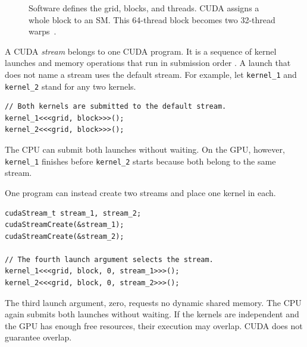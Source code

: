 \documentclass[11pt]{article}
\numberwithin{equation}{section}
\numberwithin{figure}{section}
\numberwithin{table}{section}
\newcommand{\code}[1]{\texttt{#1}}
\begin{document}
\begin{figure}[htbp]
  \caption{Software defines the grid, blocks, and threads.  CUDA assigns a whole
  block to an SM.  This 64-thread block becomes two 32-thread
  warps~\cite{gupta2020model,cuda-programming-guide}.}
  \label{fig:cuda-programming-model}
\end{figure}

\FloatBarrier

A CUDA \emph{stream} belongs to one CUDA program.  It is a sequence of kernel
launches and memory operations that run in submission order
\cite{cuda-programming-guide}.  A launch that does not name a stream uses the
default stream.  For example, let \code{kernel\_1} and \code{kernel\_2} stand for
any two kernels.

\begin{lstlisting}[language=CUDA,numbers=none]
// Both kernels are submitted to the default stream.
kernel_1<<<grid, block>>>();
kernel_2<<<grid, block>>>();
\end{lstlisting}

The CPU can submit both launches without waiting.  On the GPU, however,
\code{kernel\_1} finishes before \code{kernel\_2} starts because both belong to the
same stream.

One program can instead create two streams and place one kernel in each.

\begin{lstlisting}[language=CUDA,numbers=none]
cudaStream_t stream_1, stream_2;
cudaStreamCreate(&stream_1);
cudaStreamCreate(&stream_2);

// The fourth launch argument selects the stream.
kernel_1<<<grid, block, 0, stream_1>>>();
kernel_2<<<grid, block, 0, stream_2>>>();
\end{lstlisting}

The third launch argument, zero, requests no dynamic shared memory.  The CPU again
submits both launches without waiting.  If the kernels are independent and the GPU
has enough free resources, their execution may overlap.  CUDA does not guarantee
overlap.
\end{document}
